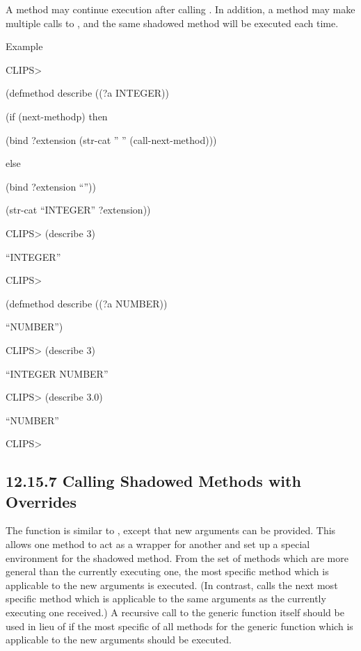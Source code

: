 \documentclass[letterpaper,10pt,english]{sphinxmanual}
\begin{document}
A method may continue execution after calling . In
addition, a method may make multiple calls to , and
the same shadowed method will be executed each time.


\begin{sphinxVerbatim}[commandchars=\\\{\}]
\end{sphinxVerbatim}

Example

CLIPS\textgreater{}

(defmethod describe ((?a INTEGER))

(if (next-methodp) then

(bind ?extension (str-cat ” ” (call-next-method)))

else

(bind ?extension “”))

(str-cat “INTEGER” ?extension))

CLIPS\textgreater{} (describe 3)

“INTEGER”

CLIPS\textgreater{}

(defmethod describe ((?a NUMBER))

“NUMBER”)

CLIPS\textgreater{} (describe 3)

“INTEGER NUMBER”

CLIPS\textgreater{} (describe 3.0)

“NUMBER”

CLIPS\textgreater{}


\subsection{12.15.7 Calling Shadowed Methods with Overrides}
\label{\detokenize{actions:calling-shadowed-methods-with-overrides}}
The function  is similar to
, except that new arguments can be provided. This
allows one method to act as a wrapper for another and set up a special
environment for the shadowed method. From the set of methods which are
more general than the currently executing one, the most specific method
which is applicable to the new arguments is executed. (In contrast,
 calls the next most specific method which is
applicable to the same arguments as the currently executing one
received.) A recursive call to the generic function itself should be
used in lieu of  if the most specific of all
methods for the generic function which is applicable to the new
arguments should be executed.
\end{document}
